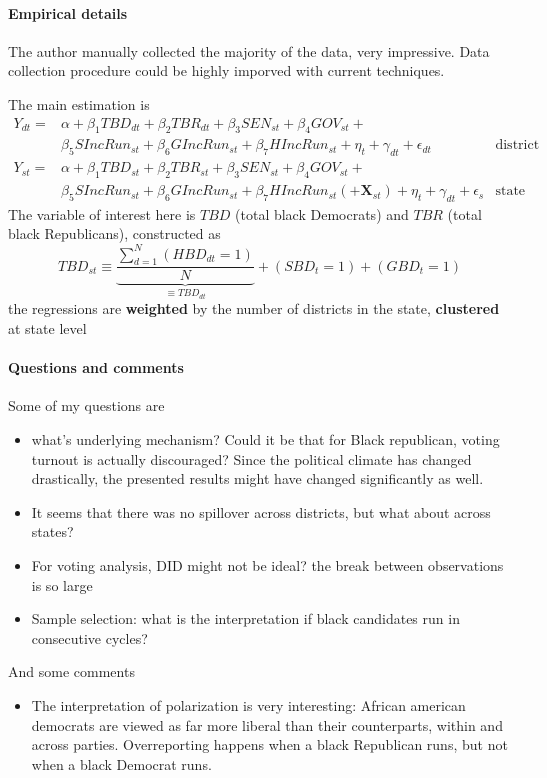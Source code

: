 \documentclass[twoside]{article}
\theoremstyle{definition}
\begin{document}
\paragraph*{Empirical details} The author manually collected the majority of the data, very impressive. Data collection procedure could be highly imporved with current techniques.

The main estimation is 
$$
\begin{aligned}
Y_{dt}= & \alpha+\beta_{1}TBD_{dt}+\beta_{2}TBR_{dt}+\beta_{3}SEN_{st}+\beta_{4}GOV_{st}+\\
& \beta_{5}SIncRun_{st}+\beta_{6}GIncRun_{st}+\beta_{7}HIncRun_{st}+\eta_{t}+\gamma_{dt}+\epsilon_{dt} & \text{district officials}\\
Y_{st}= & \alpha+\beta_{1}TBD_{st}+\beta_{2}TBR_{st}+\beta_{3}SEN_{st}+\beta_{4}GOV_{st}+\\
& \beta_{5}SIncRun_{st}+\beta_{6}GIncRun_{st}+\beta_{7}HIncRun_{st} \left(+\mathbf{X}_{st}\right) +\eta_{t}+\gamma_{dt}+\epsilon_{s} & \text{state officials}
\end{aligned}
$$
The variable of interest here is $TBD$ (total black Democrats) and $TBR$ (total black Republicans), constructed as 
$$
TBD_{st}\equiv \underbrace{\frac{\sum_{d=1}^{N}\left(HBD_{dt}=1\right)}{N}}_{\equiv TBD_{dt}}+\left(SBD_t=1\right)+\left(GBD_t=1\right)
$$
the regressions are \textbf{weighted} by the number of districts in the state, \textbf{clustered} at state level

\paragraph*{Questions and comments} Some of my questions are 
\begin{itemize}
    \item what's underlying mechanism? Could it be that for Black republican, voting turnout is actually discouraged? Since the political climate has changed drastically, the presented results might have changed significantly as well.
    \item It seems that there was no spillover across districts, but what about across states?
    \item For voting analysis, DID might not be ideal? the break between observations is so large
    \item Sample selection: what is the interpretation if black candidates run in consecutive cycles?
\end{itemize}
And some comments
\begin{itemize}
    \item The interpretation of polarization is very interesting: African american democrats are viewed as far more liberal than their counterparts, within and across parties. Overreporting happens when a black Republican runs, but not when a black Democrat runs.
\end{itemize}
\end{document}
